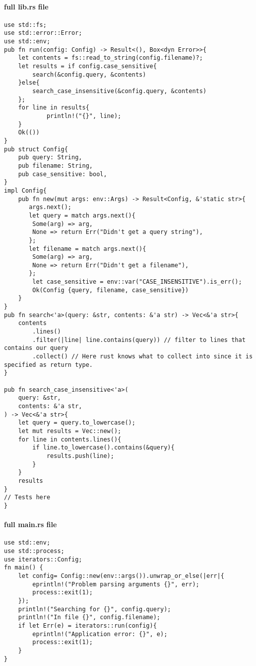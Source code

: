 \paragraph*{full lib.rs file}\begin{lstlisting}
use std::fs;
use std::error::Error;
use std::env;
pub fn run(config: Config) -> Result<(), Box<dyn Error>>{
    let contents = fs::read_to_string(config.filename)?;     
    let results = if config.case_sensitive{
        search(&config.query, &contents)
    }else{
        search_case_insensitive(&config.query, &contents)
    };
    for line in results{
            println!("{}", line);
    }
    Ok(())
}
pub struct Config{
    pub query: String,
    pub filename: String,
    pub case_sensitive: bool,
}
impl Config{
    pub fn new(mut args: env::Args) -> Result<Config, &'static str>{
       args.next();
       let query = match args.next(){
        Some(arg) => arg,
        None => return Err("Didn't get a query string"),
       };
       let filename = match args.next(){
        Some(arg) => arg,
        None => return Err("Didn't get a filename"),
       };
        let case_sensitive = env::var("CASE_INSENSITIVE").is_err(); 
        Ok(Config {query, filename, case_sensitive})
    } 
}
pub fn search<'a>(query: &str, contents: &'a str) -> Vec<&'a str>{
    contents
        .lines()
        .filter(|line| line.contains(query)) // filter to lines that contains our query
        .collect() // Here rust knows what to collect into since it is specified as return type.
}

pub fn search_case_insensitive<'a>(
    query: &str,
    contents: &'a str,
) -> Vec<&'a str>{
    let query = query.to_lowercase();
    let mut results = Vec::new();
    for line in contents.lines(){
        if line.to_lowercase().contains(&query){
            results.push(line);  
        }
    }
    results
}
// Tests here 
}
\end{lstlisting}

\paragraph*{full main.rs file}\begin{lstlisting}
use std::env;
use std::process;
use iterators::Config;
fn main() {
    let config= Config::new(env::args()).unwrap_or_else(|err|{
        eprintln!("Problem parsing arguments {}", err);
        process::exit(1);
    });
    println!("Searching for {}", config.query);
    println!("In file {}", config.filename);
    if let Err(e) = iterators::run(config){
        eprintln!("Application error: {}", e);
        process::exit(1);
    }
}
\end{lstlisting}

